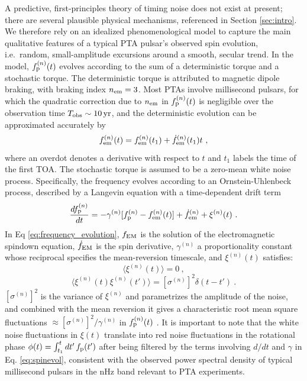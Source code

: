 \documentclass[fleqn,usenatbib,useAMS]{mnras}
\begin{document}
A predictive, first-principles theory of timing noise does not exist at present; there are several plausible physical mechanisms, referenced in Section \ref{sec:intro}. We therefore rely on an idealized phenomenological model to capture the main qualitative features of a typical PTA pulsar's observed spin evolution, i.e.\ random, small-amplitude excursions around a smooth, secular trend. In the model, $f_{\rm p}^{(n)}(t)$ evolves according to the sum of a deterministic torque and a stochastic torque. The deterministic torque is attributed to magnetic dipole braking, with braking index $n_{\rm em}=3$. Most PTAs involve millisecond pulsars, for which the quadratic correction due to $n_{\rm em}$ in $f_{\rm p}^{(n)}(t)$ is negligible over the observation time $T_{\rm obs} \sim 10 \, {\rm yr}$, and the deterministic evolution can be approximated accurately by 
\begin{equation}
 f_{\rm em}^{(n)}(t) = f_{\rm em}^{(n)}(t_1) + \dot{f}_{\rm em}^{(n)}(t_1)t \ , \label{eq:spinevol}
\end{equation} where an overdot denotes a derivative with respect to $t$ and $t_1$ labels the time of the first TOA. The stochastic torque is assumed to be a zero-mean white noise process. Specifically, the frequency evolves according to an Ornstein-Uhlenbeck process, described by a Langevin equation with a time-dependent drift term \citep{Vargas}
\begin{equation}
	\frac{df_{\rm p}^{(n)}}{dt} = -\gamma^{(n)}	 [f_{\rm p}^{(n)} - f_{\rm em}^{(n)} (t)] + \dot{f}_{\rm em}^{(n)} +\xi^{(n)}(t) \ . 
	\label{eq:frequency_evolution}
\end{equation}
In Eq \ref{eq:frequency_evolution}, $f_{\rm EM}$ is the solution of the electromagnetic spindown equation, $\dot{f}_{\rm EM}$ is the spin derivative, $\gamma^{(n)}$ a proportionality constant whose reciprocal specifies the mean-reversion timescale, and $\xi^{(n)}(t)$ satisfies:
\begin{equation}
	\langle \xi^{(n)}(t) \rangle = 0 \ ,
\end{equation}
\begin{equation}
	\langle \xi^{(n)}(t) \xi^{(n)}(t') \rangle = [\sigma^{(n)}]^2 \delta(t - t') \ .
	\label{eq:xieqn}
\end{equation}
$[\sigma^(n)]^2$ is the variance of $\xi^{(n)}$ and parametrizes the amplitude of the noise, and combined with the mean reversion it gives a characteristic root mean square fluctuations $\approx [\sigma^{(n)}]^2 / \gamma^{(n)}$ in $f_{\rm p}^{(n)}(t)$ \citep{gardiner2009stochastic}. It is important to note that the white noise fluctuations in $\xi(t)$ translate into red noise fluctuations in the rotational phase $\phi(t) = \int_{t_1}^t dt' \, f_{\rm p}(t')$ after being filtered by the terms involving $d/dt$ and $\gamma$ in Eq. \ref{eq:spinevol}, consistent with the observed power spectral density of typical millisecond pulsars in the nHz band relevant to PTA experiments. \newline 
\end{document}
